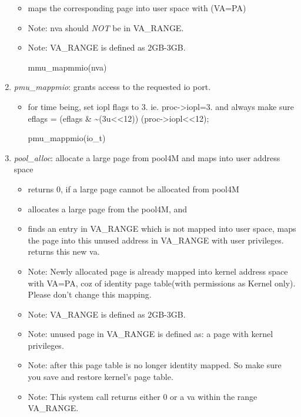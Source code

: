 \documentclass[]{article}
\newenvironment{Shaded}{}{}
\newcommand{\NormalTok}[1]{{#1}}
\begin{document}
\begin{enumerate}
  \begin{itemize}
  \item
    maps the corresponding page into user space with (VA=PA)
  \item
    Note: nva should \emph{NOT} be in VA\_RANGE.
  \item
    Note: VA\_RANGE is defined as 2GB-3GB.

\begin{Shaded}
\begin{Highlighting}[]
\NormalTok{mmu_mapmmio(nva)}
\end{Highlighting}
\end{Shaded}
  \end{itemize}
\item
  \emph{pmu\_mappmio}: grants access to the requested io port.

  \begin{itemize}
  \item
    for time being, set iopl flags to 3. ie. proc-\textgreater{}iopl=3.
    and always make sure eflags = (eflags \&
    \textasciitilde{}(3u\textless{}\textless{}12)) \textbar{}
    (proc-\textgreater{}iopl\textless{}\textless{}12);

\begin{Shaded}
\begin{Highlighting}[]
\NormalTok{pmu_mappmio(io_t)}
\end{Highlighting}
\end{Shaded}
  \end{itemize}
\item
  \emph{pool\_alloc}: allocate a large page from pool4M and maps into
  user address space

  \begin{itemize}
  \item
    returns 0, if a large page cannot be allocated from pool4M
  \item
    allocates a large page from the pool4M, and
  \item
    finds an entry in VA\_RANGE which is not mapped into user space,
    maps the page into this unused address in VA\_RANGE with user
    privileges. returns this new va.
  \item
    Note: Newly allocated page is already mapped into kernel address
    space with VA=PA, coz of identity page table(with permissions as
    Kernel only). Please don't change this mapping.
  \item
    Note: VA\_RANGE is defined as 2GB-3GB.
  \item
    Note: unused page in VA\_RANGE is defined as: a page with kernel
    privileges.
  \item
    Note: after this page table is no longer identity mapped. So make
    sure you save and restore kernel's page table.
  \item
    Note: This system call returns either 0 or a va within the range
    VA\_RANGE.


\end{itemize}
\end{enumerate}
\end{document}

